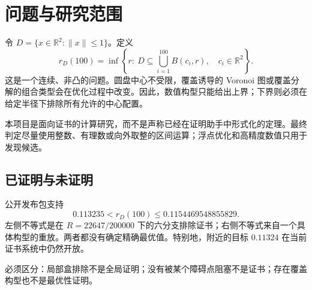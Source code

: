 \section{问题与研究范围}
令 $D=\{x\in\mathbb R^2:\|x\|\le1\}$。定义
\[
r_D(100)=\inf\left\{r:\ D\subseteq\bigcup_{i=1}^{100}B(c_i,r),\quad c_i\in\mathbb R^2\right\}.
\]
这是一个连续、非凸的问题。圆盘中心不受限，覆盖诱导的 Voronoi 图或覆盖分解的组合类型会在优化过程中改变。因此，数值构型只能给出上界；下界则必须在给定半径下排除所有允许的中心配置。

本项目是面向证书的计算研究，而不是声称已经在证明助手中形式化的定理。最终判定尽量使用整数、有理数或向外取整的区间运算；浮点优化和高精度数值只用于发现候选。

\subsection{已证明与未证明}
公开发布包支持
\[
0.113235<r_D(100)\le0.1154469548855829.
\]
左侧不等式是在 $R=22647/200000$ 下的六分支排除证书；右侧不等式来自一个具体构型的重放。两者都没有确定精确最优值。特别地，附近的目标 $0.11324$ 在当前证书系统中仍然开放。

必须区分：局部盒排除不是全局证明；没有被某个障碍点阻塞不是证书；存在覆盖构型也不是最优性证明。
